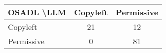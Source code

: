 \begin{tabular}{l|cc}\hline
	\textbf{OSADL \textbackslash LLM} & Copyleft & Permissive\\\hline
	Copyleft & 21 & 12\\
	Permissive & 0 & 81\\\hline
\end{tabular}
